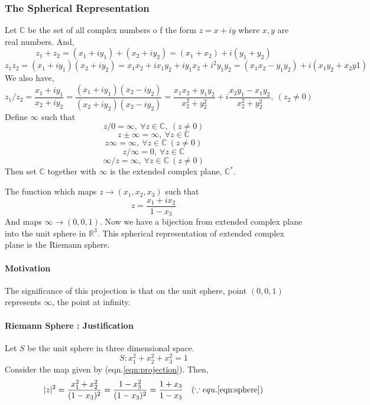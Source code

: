 \subsubsection{The Spherical Representation}
\begin{definition}
	Let $\mathbb{C}$ be the set of all complex numbers o f the form $z = x+iy$ where $x,y$ are real numbers.
	And,
	\[ z_1+z_2 = (x_1+iy_1) + (x_2+iy_2) = (x_1+x_2) + i (y_1+y_2) \]
	\[ z_1 z_2 = (x_1+iy_1) (x_2+iy_2) = x_1x_2 + ix_1y_2 + iy_1x_2 + i^2y_1y_2 = (x_1x_2-y_1y_2) + i(x_1y_2+x_2y1) \]
	We also have,
	\[ z_1/z_2 = \frac{x_1+iy_1}{x_2+iy_2} = \frac{(x_1+iy_1)(x_2-iy_2)}{(x_2+iy_2)(x_2-iy_2)} = \frac{x_1x_2+y_1y_2}{x_2^2+y_2^2}+i\frac{x_2y_1-x_1y_2}{x_2^2+y_2^2},\ (z_2 \ne 0) \]
	Define $\infty$ such that
	\[ z/0 = \infty,\ \forall z \in \mathbb{C},\ (z \ne 0)\]
	\[ z \pm \infty = \infty,\ \forall z \in \mathbb{C} \]
	\[ z \infty = \infty,\ \forall z \in \mathbb{C}\ (z \ne 0) \]
	\[ z / \infty = 0,\ \forall z \in \mathbb{C} \]
	\[ \infty/z = \infty,\ \forall z \in \mathbb{C}\ (z \ne 0) \]
	Then set $\mathbb{C}$ together with $\infty$ is the extended complex plane, $\mathbb{C}^\ast$.
\end{definition}

\begin{definition}
	The function which maps $z \to (x_1,x_2,x_3)$ such that
	\begin{equation}
		z = \frac{x_1+ix_2}{1-x_3}
		\label{eqn:projection}
	\end{equation}
	And maps $\infty \to (0,0,1)$.
	Now we have a bijection from extended complex plane into the unit sphere in $\mathbb{R}^3$.
	This spherical representation of extended complex plane is the Riemann sphere.
\end{definition}

\paragraph{Motivation} The significance of this projection is that on the unit sphere, point $(0,0,1)$ represents $\infty$, the point at infinity.

\paragraph{Riemann Sphere : Justification}
Let $S$ be the unit sphere in three dimensional space.
\begin{equation}
	 S : x_1^2 + x_2^2 + x_3^2 = 1 
	 \label{eqn:sphere}
\end{equation}
Consider the map given by (eqn.\ref{eqn:projection}).
Then,
	\[ |z|^2  = \frac{x_1^2+x_2^2}{(1-x_3)^2} = \frac{1-x_3^2}{(1-x_3)^2} = \frac{1+x_3}{1-x_3}\quad (\because equ. \ref{eqn:sphere}) \]

